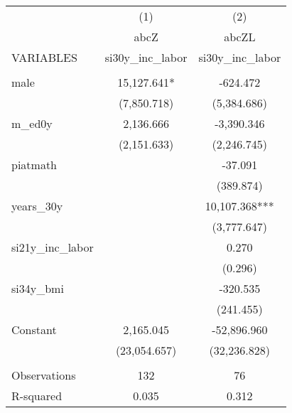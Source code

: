 \begin{tabular}{lcc} \hline
 & (1) & (2) \\
 & abcZ & abcZL \\
VARIABLES & si30y\_inc\_labor & si30y\_inc\_labor \\ \hline
 &  &  \\
male & 15,127.641* & -624.472 \\
 & (7,850.718) & (5,384.686) \\
m\_ed0y & 2,136.666 & -3,390.346 \\
 & (2,151.633) & (2,246.745) \\
piatmath &  & -37.091 \\
 &  & (389.874) \\
years\_30y &  & 10,107.368*** \\
 &  & (3,777.647) \\
si21y\_inc\_labor &  & 0.270 \\
 &  & (0.296) \\
si34y\_bmi &  & -320.535 \\
 &  & (241.455) \\
Constant & 2,165.045 & -52,896.960 \\
 & (23,054.657) & (32,236.828) \\
 &  &  \\
Observations & 132 & 76 \\
 R-squared & 0.035 & 0.312 \\ \hline
\end{tabular}
